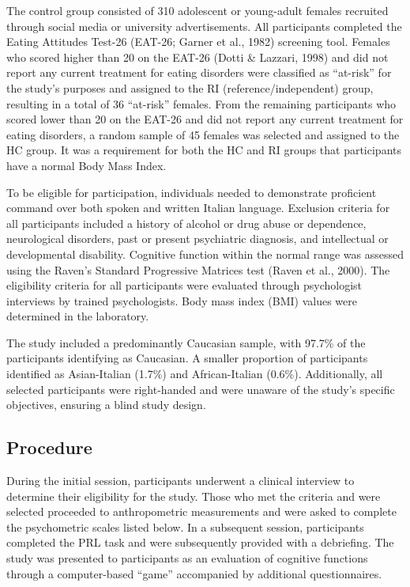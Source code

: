 \documentclass[
  man,floatsintext]{apa6}
\begin{document}
The control group consisted of 310 adolescent or young-adult females recruited through social media or university advertisements. All participants completed the Eating Attitudes Test-26 (EAT-26; Garner et al., 1982) screening tool. Females who scored higher than 20 on the EAT-26 (Dotti \& Lazzari, 1998) and did not report any current treatment for eating disorders were classified as ``at-risk'' for the study's purposes and assigned to the RI (reference/independent) group, resulting in a total of 36 ``at-risk'' females. From the remaining participants who scored lower than 20 on the EAT-26 and did not report any current treatment for eating disorders, a random sample of 45 females was selected and assigned to the HC group. It was a requirement for both the HC and RI groups that participants have a normal Body Mass Index.

To be eligible for participation, individuals needed to demonstrate proficient command over both spoken and written Italian language. Exclusion criteria for all participants included a history of alcohol or drug abuse or dependence, neurological disorders, past or present psychiatric diagnosis, and intellectual or developmental disability. Cognitive function within the normal range was assessed using the Raven's Standard Progressive Matrices test (Raven et al., 2000). The eligibility criteria for all participants were evaluated through psychologist interviews by trained psychologists. Body mass index (BMI) values were determined in the laboratory.

The study included a predominantly Caucasian sample, with 97.7\% of the participants identifying as Caucasian. A smaller proportion of participants identified as Asian-Italian (1.7\%) and African-Italian (0.6\%). Additionally, all selected participants were right-handed and were unaware of the study's specific objectives, ensuring a blind study design.

\hypertarget{procedure}{%
\subsection{Procedure}\label{procedure}}

During the initial session, participants underwent a clinical interview to determine their eligibility for the study. Those who met the criteria and were selected proceeded to anthropometric measurements and were asked to complete the psychometric scales listed below. In a subsequent session, participants completed the PRL task and were subsequently provided with a debriefing. The study was presented to participants as an evaluation of cognitive functions through a computer-based ``game'' accompanied by additional questionnaires.
\end{document}
